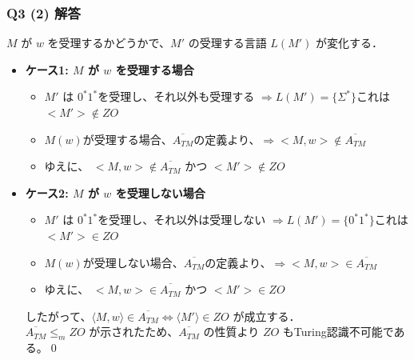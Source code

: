 \begin{frame}[fragile]
\frametitle{Q3 (2) 解答}
$M$ が $w$ を受理するかどうかで、$M'$ の受理する言語 $L(M')$ が変化する．

\begin{itemize}
  \item \textbf{ケース1: $M$ が $w$ を受理する場合}
  \begin{itemize}
      \item $M'$ は $0^*1^*$を受理し、それ以外も受理する $\Rightarrow L(M') = \{\Sigma^*\}$これは$<M'> \notin ZO$
      \item $M(w)$が受理する場合、$\overline{A_{TM}}$の定義より、$\Rightarrow <M, w> \notin \overline{A_{TM}}$
      \item ゆえに、 $<M, w> \notin \overline{A_{TM}}$ かつ $<M'> \notin ZO$
  \end{itemize}
  \vspace{1em}
  \item \textbf{ケース2: $M$ が $w$ を受理しない場合}
  \begin{itemize}
      \item $M'$ は $0^*1^*$を受理し、それ以外は受理しない $\Rightarrow L(M') = \{0^*1^*\}$これは$<M'> \in ZO$
      \item $M(w)$が受理しない場合、$\overline{A_{TM}}$の定義より、$\Rightarrow <M, w> \in \overline{A_{TM}}$
      \item ゆえに、 $<M, w> \in \overline{A_{TM}}$ かつ $<M'> \in ZO$
  \end{itemize}
  \vspace{0.5em}
したがって、$\langle M, w \rangle \in \overline{A_{TM}} \iff \langle M' \rangle \in {ZO}$ が成立する．\\
$\overline{A_{TM}} \le_m {ZO}$ が示されたため、$\overline{A_{TM}}$ の性質より ${ZO}$ もTuring認識不可能である。\qed
\end{itemize}
\end{frame}
